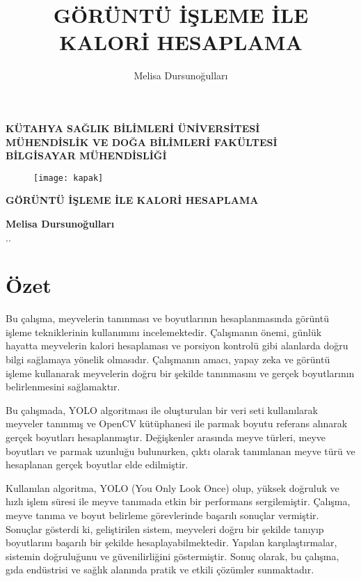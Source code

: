 \documentclass[11pt,a4paper]{report}
\title{GÖRÜNTÜ İŞLEME İLE KALORİ HESAPLAMA}
\author{Melisa Dursunoğulları}
\begin{document}
	\begin{titlepage}
	
	\textbf{KÜTAHYA SAĞLIK BİLİMLERİ ÜNİVERSİTESİ}\\ \centering
    \textbf{MÜHENDİSLİK VE DOĞA BİLİMLERİ FAKÜLTESİ}\\ \centering
    \textbf{BİLGİSAYAR MÜHENDİSLİĞİ}\\ \centering
    \vspace{1cm}
    \begin{figure}[!h]
	\centering
	\texttt{[image: kapak]}
	\caption{\cite{kapakfoto}}

    \end{figure}
    \vspace{1cm}
   
   \LARGE
   \textbf{GÖRÜNTÜ İŞLEME İLE KALORİ HESAPLAMA}
   
   \vspace{2cm}
   \large
   \textbf{Melisa Dursunoğulları}\\
   \the\day.\the\month.\the\year
\end{titlepage}
  	\raggedright
  	\newpage
  	\section*{Özet}
    \begin{justify}
   	  Bu çalışma, meyvelerin tanınması ve boyutlarının hesaplanmasında görüntü işleme tekniklerinin kullanımını incelemektedir. Çalışmanın önemi, günlük hayatta meyvelerin kalori hesaplaması ve porsiyon kontrolü gibi alanlarda doğru bilgi sağlamaya yönelik olmasıdır. Çalışmanın amacı, yapay zeka ve görüntü işleme kullanarak meyvelerin doğru bir şekilde tanınmasını ve gerçek boyutlarının belirlenmesini sağlamaktır. 
     \newline
     
      Bu çalışmada, YOLO algoritması ile oluşturulan bir veri seti kullanılarak meyveler tanınmış ve OpenCV kütüphanesi ile parmak boyutu referans alınarak gerçek boyutları hesaplanmıştır. Değişkenler arasında meyve türleri, meyve boyutları ve parmak uzunluğu bulunurken, çıktı olarak tanımlanan meyve türü ve hesaplanan gerçek boyutlar elde edilmiştir. 
     \newline
     
      Kullanılan algoritma, YOLO (You Only Look Once) olup, yüksek doğruluk ve hızlı işlem süresi ile meyve tanımada etkin bir performans sergilemiştir. Çalışma, meyve tanıma ve boyut belirleme görevlerinde başarılı sonuçlar vermiştir. Sonuçlar gösterdi ki, geliştirilen sistem, meyveleri doğru bir şekilde tanıyıp boyutlarını başarılı bir şekilde hesaplayabilmektedir. Yapılan karşılaştırmalar, sistemin doğruluğunu ve güvenilirliğini göstermiştir. Sonuç olarak, bu çalışma, gıda endüstrisi ve sağlık alanında pratik ve etkili çözümler sunmaktadır.
     \end{justify}
\end{document}
